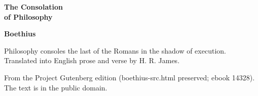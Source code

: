 \documentclass[11pt,letterpaper]{article}
\begin{document}
\color{ink}

\begin{titlepage}
\centering
\vspace*{4em}
{\LARGE\bfseries\color{heading} The Consolation\\[0.3em]of Philosophy\par}
\vspace{2em}
{\Large\bfseries\color{heading} Boethius\par}
\vspace{2.5em}
{\itshape\color{subhead}\parbox{0.8\linewidth}{\centering Philosophy consoles the last of the Romans in the shadow of execution. Translated into English prose and verse by H. R. James.\par}}
\vfill
{\small From the Project Gutenberg edition (boethius-src.html preserved; ebook 14328). The text is in the public domain.\par}
\vspace{2em}
\end{titlepage}

\tableofcontents


\end{document}
